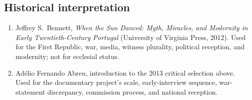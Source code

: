 \subsection{Historical interpretation}

\begin{enumerate}
  \item Jeffrey S.~Bennett, \emph{When the Sun Danced: Myth, Miracles, and Modernity in Early Twentieth-Century Portugal} (University of Virginia Press, 2012). Used for the First Republic, war, media, witness plurality, political reception, and modernity; not for ecclesial status.
  \item Adélio Fernando Abreu, introduction to the 2013 critical selection above. Used for the documentary project's scale, early-interview sequence, war-statement discrepancy, commission process, and national reception.
\end{enumerate}

\endgroup
